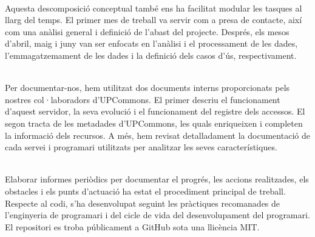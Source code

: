 \noindent \\
Aquesta descomposició conceptual també ens ha facilitat modular les tasques al llarg del temps.
El primer mes de treball va servir com a presa de contacte, així com una anàlisi general i definició de l’abast del projecte.
Després, els mesos d’abril, maig i juny van ser enfocats en l’anàlisi i el processament de les dades, l’emmagatzemament de les dades i la definició dels casos d’ús, respectivament.

\noindent \\
Per documentar-nos, hem utilitzat dos documents interns proporcionats pels nostres col·laboradors d’UPCommons.
El primer descriu el funcionament d’aquest servidor, la seva evolució i el funcionament del registre dels accessos.
El segon tracta de les metadades d’UPCommons, les quals enriqueixen i completen la informació dels recursos.
A més, hem revisat detalladament la documentació de cada servei i programari utilitzats per analitzar les seves característiques.

\noindent \\
Elaborar informes periòdics per documentar el progrés, les accions realitzades, els obstacles i els punts d’actuació ha estat el procediment principal de treball.
Respecte al codi, s’ha desenvolupat seguint les pràctiques recomanades de l’enginyeria de programari i del cicle de vida del desenvolupament del programari.
El repositori es troba públicament a GitHub sota una llicència MIT.